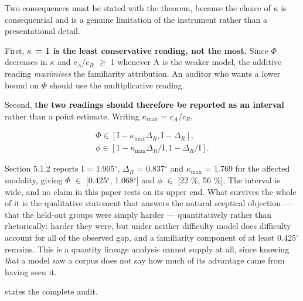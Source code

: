 Two consequences must be stated with the theorem, because the choice of $\kappa$ is consequential and is a genuine limitation of the instrument rather than a presentational detail.

First, \textbf{$\kappa$ = 1 is the least conservative reading, not the most.} Since $\Phi$ decreases in $\kappa$ and $c_{A}$/$c_{R}$ $\geq$ 1 whenever A is the weaker model, the additive reading \emph{maximises} the familiarity attribution. An auditor who wants a lower bound on $\Phi$ should use the multiplicative reading.

Second, \textbf{the two readings should therefore be reported as an interval} rather than a point estimate. Writing $\kappa_{\mathrm{max}}$ = $c_{A}$/$c_{R}$,

\begin{equation}
\label{eq:60}
\begin{aligned}
\Phi \in [ \mathrm{I} - \kappa _{\mathrm{max}} \Delta _R , \mathrm{I} - \Delta _R ] , \\
\phi \in [ 1 - \kappa _{\mathrm{max}} \Delta _R/\mathrm{I} , 1 - \Delta _R/\mathrm{I} ] .
\end{aligned}
\end{equation}

Section 5.1.2 reports $\mathrm{I}$ = 1.905$^{\circ}$, $\Delta_{R}$ = 0.837$^{\circ}$ and $\kappa_{\mathrm{max}}$ = 1.769 for the affected modality, giving $\Phi$ $\in$ [0.425$^{\circ}$, 1.068$^{\circ}$] and $\phi$ $\in$ [22 \%, 56 \%]. The interval is wide, and no claim in this paper rests on its upper end. What survives the whole of it is the qualitative statement that answers the natural sceptical objection --- that the held-out groups were simply harder --- quantitatively rather than rhetorically: harder they were, but under neither difficulty model does difficulty account for all of the observed gap, and a familiarity component of at least 0.425$^{\circ}$ remains. This is a quantity lineage analysis cannot supply at all, since knowing \emph{that} a model saw a corpus does not say how much of its advantage came from having seen it.

 states the complete audit.


